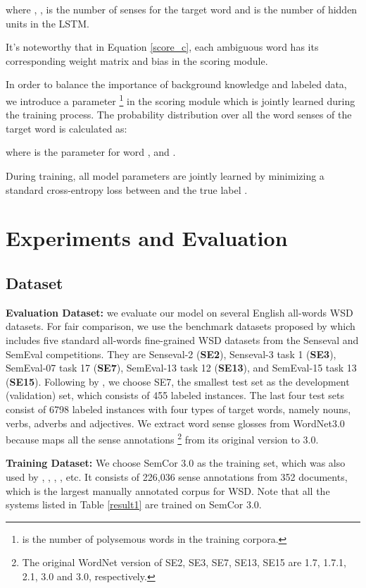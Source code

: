 \documentclass[11pt,a4paper]{article}
\begin{document}
where , ,  is the number of senses for the target word  and  is the number of hidden units in the LSTM.

It's noteworthy that in Equation \ref{score_c}, each ambiguous word  has its corresponding weight matrix  and bias  in the scoring module.


In order to balance the importance of background knowledge and labeled data, we introduce a parameter  \footnote{ is the number of polysemous words in the training corpora.} in the scoring module which is jointly learned during the training process.
The probability distribution  over all the word senses of the target word is calculated as:

where  is the parameter for word , and .

During training, all model parameters are jointly learned by minimizing a standard cross-entropy loss between  and the true label .

\section{Experiments and Evaluation} \label{sec:Experiments}

\subsection{Dataset} \label{subsec:dataset}
\textbf{Evaluation Dataset:}
we evaluate our model on several English all-words WSD datasets.
For fair comparison, we use the benchmark datasets proposed  by \citet{raganato2017wsdData} which includes five standard all-words fine-grained WSD datasets from the Senseval and SemEval competitions. They are
Senseval-2 (\textbf{SE2}), Senseval-3 task 1 (\textbf{SE3}),  SemEval-07 task 17 (\textbf{SE7}), SemEval-13 task 12 (\textbf{SE13}), and SemEval-15 task 13 (\textbf{SE15}).
Following by \citet{Raganato2017}, we choose SE7, the smallest test set as the development (validation) set, which consists of 455 labeled instances. The last four test sets consist of 6798 labeled instances with four types of target words, namely nouns, verbs, adverbs and adjectives.
We extract word sense glosses from WordNet3.0 because \citet{raganato2017wsdData} maps all the sense annotations \footnote{The original WordNet version of SE2, SE3, SE7, SE13, SE15 are 1.7, 1.7.1, 2.1, 3.0 and 3.0, respectively.} from its original version to 3.0.



\textbf{Training Dataset:}
We choose SemCor 3.0 as the training set,
which was also used by \citet{Raganato2017}, \citet{raganato2017wsdData}, \citet{Iacobacci2016}, \citet{Zhong2010IMS}, etc.
It consists of 226,036 sense annotations from 352 documents, which is the largest manually annotated corpus for WSD.
Note that all the systems listed in Table \ref{result1} are trained on SemCor 3.0.
\end{document}
